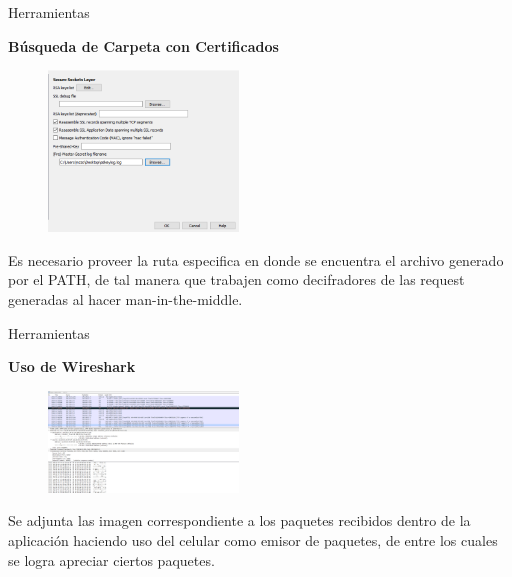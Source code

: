 \begin{frame}[t,fragile]{Herramientas}

\textbf{Búsqueda de Carpeta con Certificados }

\begin{figure} 
\vspace{2pt}
  \begin{center}
    \includegraphics[width=0.45\textwidth]{archivossllog.png}
    \label{fig:databaseUserTable}
  \end{center}
  \vspace{2pt}
\end{figure} 

\bigskip

Es necesario proveer la ruta especifica en donde se encuentra el archivo generado por el PATH, de tal manera que trabajen como decifradores de las request generadas al hacer man-in-the-middle.


\end{frame}



\begin{frame}[t,fragile]{Herramientas}

\textbf{Uso de Wireshark}

\begin{figure} 
\vspace{2pt}
  \begin{center}
    \includegraphics[width=0.45\textwidth]{paqueteswiressl.png}
    \label{fig:databaseUserTable}
  \end{center}
  \vspace{2pt}
\end{figure} 

\bigskip

Se adjunta las imagen correspondiente a los paquetes recibidos dentro de la aplicación haciendo uso del celular como emisor de paquetes, de entre los cuales se logra apreciar ciertos paquetes.


\end{frame}


